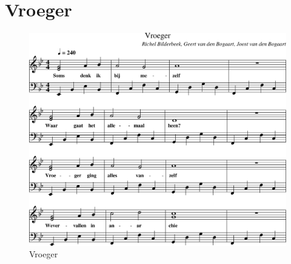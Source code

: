 \section{Vroeger}



\begin{figure}[!htbp]
  \includegraphics[width=\textwidth,height=\textheight,keepaspectratio]{../songs/08_vroeger.png}
  \caption{Vroeger}
  \label{fig:08_vroeger}
\end{figure}
